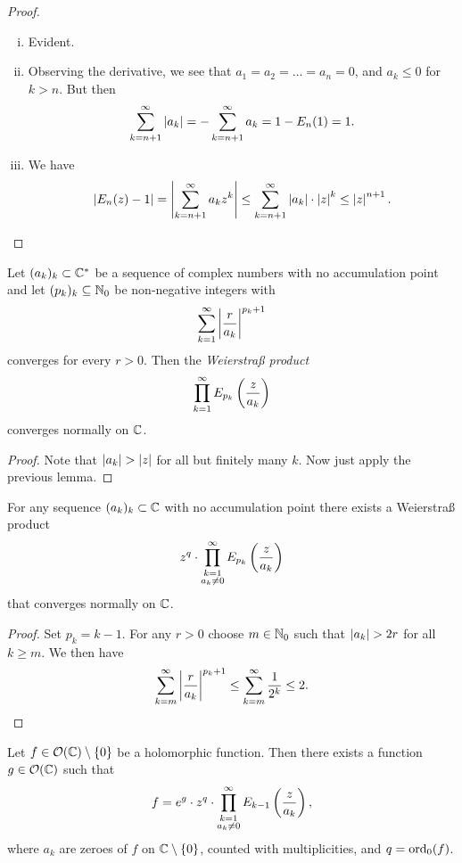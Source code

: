 \begin{proof}
\phantom{i}
\begin{enumerate}[i)]
\item Evident.
\item Observing the derivative, we see that
$a_1 = a_2 = \dots = a_n = 0$, and $a_k \leq 0$ for $k > n$. But
then
\[
\sum_{k=n+1}^\infty \left\lvert a_k\right\rvert =
-\sum_{k=n+1}^\infty a_k =
1 - E_n(1) =
1.
\]
\item We have
\[
\left\lvert E_n(z) - 1\right\rvert =
\left\lvert \sum_{k=n+1}^\infty a_k z^k\right\rvert \leq
\sum_{k=n+1}^\infty \left\lvert a_k\right\rvert \cdot \left\lvert z\right\rvert^k \leq
\left\lvert z\right\rvert^{n+1}. \qedhere
\]
\end{enumerate}
\end{proof}

\begin{lema}
Let $(a_k)_k \subset \mathbb{C}^*$ be a sequence of complex numbers with no
accumulation point and let $(p_k)_k \subseteq \mathbb{N}_0$ be non-negative
integers with
\[
\sum_{k=1}^\infty \left\lvert \frac{r}{a_k}\right\rvert^{p_k+1}
\]
converges for every $r > 0$. Then the
\emph{Weierstraß product}
\[
\prod_{k=1}^\infty E_{p_k} \left(\frac{z}{a_k}\right)
\]
converges normally on $\mathbb{C}$.
\end{lema}

\begin{proof}
Note that $\left\lvert a_k\right\rvert > \left\lvert z\right\rvert$ for all but finitely many $k$. Now
just apply the previous lemma.
\end{proof}

\begin{izrek}
For any sequence $(a_k)_k \subset \mathbb{C}$ with no accumulation point
there exists a Weierstraß product
\[
z^q \cdot \prod_{\substack{k=1 \\ a_k \ne 0}}^\infty
E_{p_k} \left(\frac{z}{a_k}\right)
\]
that converges normally on $\mathbb{C}$.
\end{izrek}

\begin{proof}
Set $p_k = k-1$. For any $r > 0$ choose $m \in \mathbb{N}_0$ such that
$\left\lvert a_k\right\rvert > 2r$ for all $k \geq m$. We then have
\[
\sum_{k=m}^\infty \left\lvert \frac{r}{a_k}\right\rvert^{p_k+1} \leq
\sum_{k=m}^\infty \frac{1}{2^k} \leq
2. \qedhere
\]
\end{proof}

\begin{izrek}
Let $f \in \mathcal{O}(\mathbb{C}) \setminus \left\{0\right\}$ be a holomorphic
function. Then there exists a function $g \in \mathcal{O}(\mathbb{C})$ such
that
\[
f = e^g \cdot z^q \cdot \prod_{\substack{k=1 \\ a_k \ne 0}}^\infty
E_{k-1} \left(\frac{z}{a_k}\right),
\]
where $a_k$ are zeroes of $f$ on $\mathbb{C} \setminus \left\{0\right\}$, counted
with multiplicities, and $q = \operatorname{ord}_0(f)$.
\end{izrek}

